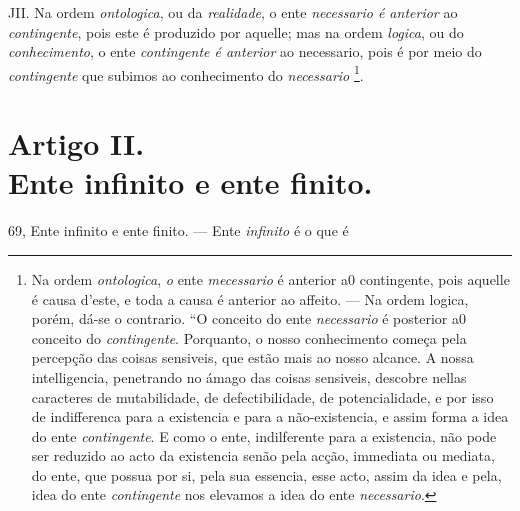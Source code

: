  JII. Na ordem \emph{ontologica}, ou da \emph{realidade}, o ente \emph{necessario é anterior} ao \emph{contingente}, pois este é produzido por aquelle; mas na ordem \emph{logica}, ou do \emph{conhecimento}, o ente \emph{contingente é anterior} ao necessario, pois é por meio do \emph{contingente} que subimos ao conhecimento do \emph{necessario} \footnote{Na ordem \emph{ontologica}, \emph{o} ente \emph{mecessario} é anterior a0 contingente, pois aquelle é causa d'este, e toda a causa é anterior ao affeito. --- Na ordem logica, porém, dá-se o contrario. “O conceito do ente \emph{necessario} é posterior a0 conceito do \emph{contingente}. Porquanto, o nosso conhecimento começa pela percepção das coisas sensiveis, que estão mais ao nosso alcance. A nossa intelligencia, penetrando no ámago das coisas sensiveis, descobre nellas caracteres de mutabilidade, de defectibilidade, de potencialidade, e por isso de indifferenca para a existencia e para a não-existencia, e assim forma a idea do ente \emph{contingente}. E como o ente, indilferente para a existencia, não pode ser reduzido ao acto da existencia senão pela acção, immediata ou mediata, do ente, que possua por si, pela sua essencia, esse acto, assim da idea e pela, idea do ente \emph{contingente} nos elevamos a idea do ente \emph{necessario}.}.


\section*{Artigo II.\\ Ente infinito e ente finito.}

69, Ente infinito e ente finito. --- Ente \emph{infinito} é o que é

